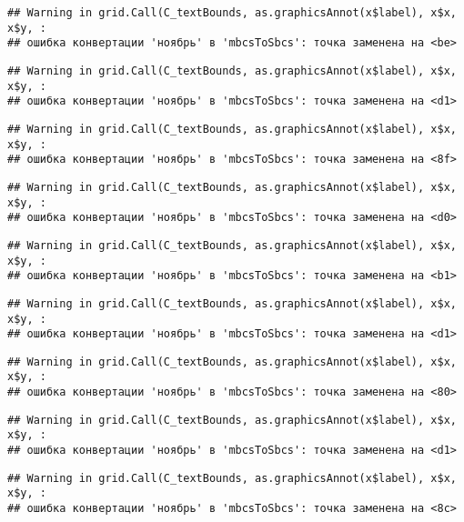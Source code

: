 \documentclass[
]{article}
\begin{document}
\begin{verbatim}
## Warning in grid.Call(C_textBounds, as.graphicsAnnot(x$label), x$x, x$y, :
## ошибка конвертации 'ноябрь' в 'mbcsToSbcs': точка заменена на <be>
\end{verbatim}

\begin{verbatim}
## Warning in grid.Call(C_textBounds, as.graphicsAnnot(x$label), x$x, x$y, :
## ошибка конвертации 'ноябрь' в 'mbcsToSbcs': точка заменена на <d1>
\end{verbatim}

\begin{verbatim}
## Warning in grid.Call(C_textBounds, as.graphicsAnnot(x$label), x$x, x$y, :
## ошибка конвертации 'ноябрь' в 'mbcsToSbcs': точка заменена на <8f>
\end{verbatim}

\begin{verbatim}
## Warning in grid.Call(C_textBounds, as.graphicsAnnot(x$label), x$x, x$y, :
## ошибка конвертации 'ноябрь' в 'mbcsToSbcs': точка заменена на <d0>
\end{verbatim}

\begin{verbatim}
## Warning in grid.Call(C_textBounds, as.graphicsAnnot(x$label), x$x, x$y, :
## ошибка конвертации 'ноябрь' в 'mbcsToSbcs': точка заменена на <b1>
\end{verbatim}

\begin{verbatim}
## Warning in grid.Call(C_textBounds, as.graphicsAnnot(x$label), x$x, x$y, :
## ошибка конвертации 'ноябрь' в 'mbcsToSbcs': точка заменена на <d1>
\end{verbatim}

\begin{verbatim}
## Warning in grid.Call(C_textBounds, as.graphicsAnnot(x$label), x$x, x$y, :
## ошибка конвертации 'ноябрь' в 'mbcsToSbcs': точка заменена на <80>
\end{verbatim}

\begin{verbatim}
## Warning in grid.Call(C_textBounds, as.graphicsAnnot(x$label), x$x, x$y, :
## ошибка конвертации 'ноябрь' в 'mbcsToSbcs': точка заменена на <d1>
\end{verbatim}

\begin{verbatim}
## Warning in grid.Call(C_textBounds, as.graphicsAnnot(x$label), x$x, x$y, :
## ошибка конвертации 'ноябрь' в 'mbcsToSbcs': точка заменена на <8c>
\end{verbatim}
\end{document}
